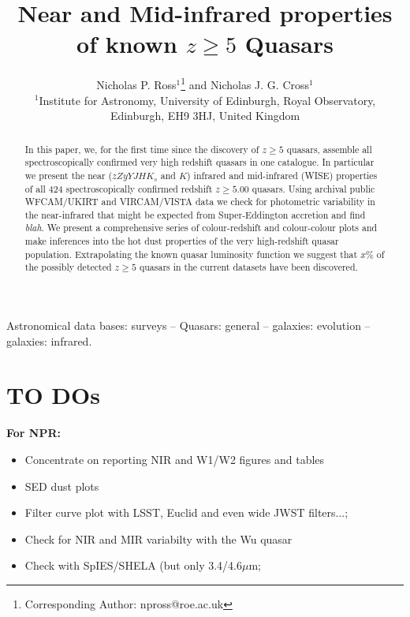 \documentclass[usenatbib]{mnras}
\begin{document}
\title[Very high-$z$ Quasars]
        {Near and Mid-infrared properties of known $z\geq5$ Quasars}
\author[Ross \& Cross]
       {Nicholas P. Ross$^{1}$\thanks{Corresponding Author: npross@roe.ac.uk} and Nicholas J. G. Cross$^{1}$
\\ 
$^1$Institute for Astronomy, University of Edinburgh, Royal Observatory, Edinburgh, EH9 3HJ, United Kingdom\\
}

\maketitle
\begin{abstract}
In this paper, we, for the first time since the discovery of $z\geq5$
quasars, assemble all spectroscopically confirmed very high redshift
quasars in one catalogue.  In particular we present the near
($zZyYJHK_{s}$ and $K$) infrared and mid-infrared (WISE) properties of
all 424 spectroscopically confirmed redshift $z\geq5.00$ quasars.
Using archival public WFCAM/UKIRT and VIRCAM/VISTA data we check for
photometric variability in the near-infrared that might be expected
from Super-Eddington accretion and find {\it blah}.  We present a
comprehensive series of colour-redshift and colour-colour plots and
make inferences into the hot dust properties of the very high-redshift
quasar population. Extrapolating the known quasar luminosity function
we suggest that $x$\% of the possibly detected $z\geq5$ quasars in the
current datasets have been discovered.
\end{abstract}


\begin{keywords}
Astronomical data bases: surveys -- 
Quasars: general -- 
galaxies: evolution -- 
galaxies: infrared.
\end{keywords}

\iffalse
\section*{TO DOs}
{\bf For NPR: }
\begin{itemize}
\item Concentrate on reporting NIR and W1/W2 figures and tables
\item SED dust plots 
\item Filter curve plot with LSST, Euclid and even wide JWST filters...; 
\item Check for NIR and MIR variabilty with the Wu quasar
\item Check with SpIES/SHELA (but only 3.4/4.6$\mu$m; 
\end{itemize}
\end{document}
